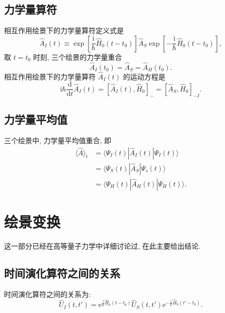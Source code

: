 \subsection{ 力学量算符}

相互作用绘景下的力学量算符定义式是
\begin{equation}
   \hat A_I(t)\equiv \exp\left[ \frac{\mathrm i}{\hbar}\hat H_0(t-t_0) \right]\hat A_S\exp\left[ -\frac{\mathrm i}{\hbar}\hat H_0(t-t_0) \right], 
\end{equation}
取 $t=t_0$ 时刻, 三个绘景的力学量重合
\begin{equation}
   \hat A_I(t_0)=\hat A_S=\hat A_H(t_0). 
\end{equation}
相互作用绘景下的力学量算符 $\hat A_I(t)$ 的运动方程是
\begin{equation}
   \mathrm i\hbar\frac{\mathrm d}{\mathrm dt}\hat A_I(t)=\left[ \hat A_I(t), \hat H_0 \right]_-=\left[ \hat A_S, \hat H_0 \right]_{-I}. 
\end{equation}

\subsection{ 力学量平均值}

三个绘景中, 力学量平均值重合, 即
   \begin{align}
      \langle \hat A \rangle_t&=\langle \Psi_I(t)|\hat A_I(t)|\Psi_I(t) \rangle\nonumber\\
      &=\langle\Psi_S(t)|\hat A_S|\Psi_s(t)\rangle\nonumber\\
      &=\langle \Psi_H(t)|\hat A_H(t)|\Psi_H(t)\rangle. 
      \end{align}
\section{ 绘景变换}

这一部分已经在高等量子力学中详细讨论过, 在此主要给出结论. 

\subsection{ 时间演化算符之间的关系}

时间演化算符之间的关系为: 
\begin{equation}\label{huijingbianhuan}
   \hat U_I(t, t')=\mathrm e^{\frac{\mathrm i}{\hbar}\hat H_0(t-t_0)}\hat U_S(t, t')\mathrm e^{-\frac{\mathrm i}{\hbar}\hat H_0(t'-t_0)}. 
\end{equation}

